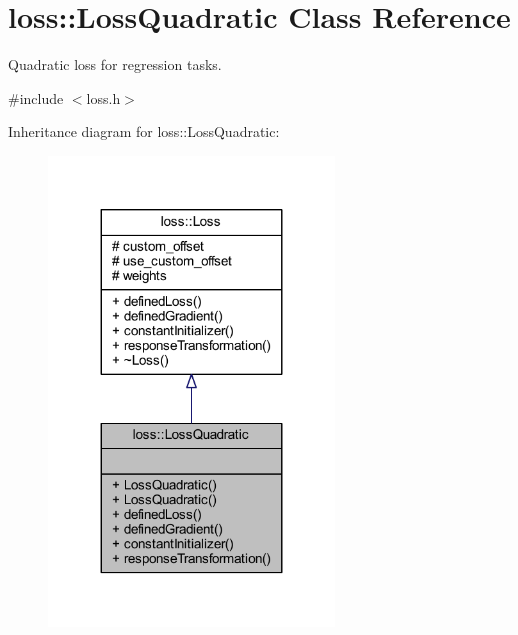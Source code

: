 \hypertarget{classloss_1_1_loss_quadratic}{}\section{loss\+:\+:Loss\+Quadratic Class Reference}
\label{classloss_1_1_loss_quadratic}


Quadratic loss for regression tasks.  




{\ttfamily \#include $<$loss.\+h$>$}



Inheritance diagram for loss\+:\+:Loss\+Quadratic\+:\nopagebreak
\begin{figure}[H]
\begin{center}
\leavevmode
\includegraphics[width=215pt]{classloss_1_1_loss_quadratic__inherit__graph}
\end{center}
\end{figure}


